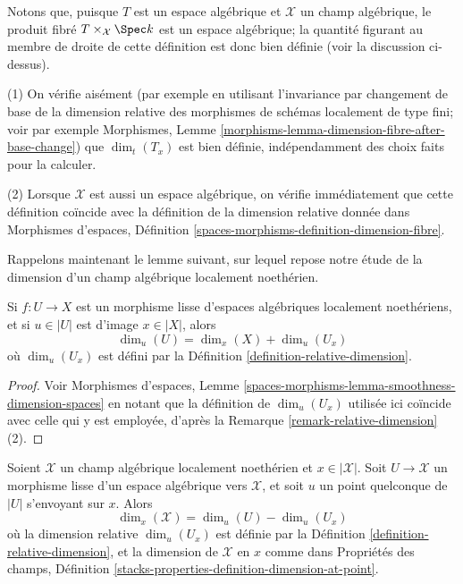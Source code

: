 \noindent
Notons que, puisque $T$ est un espace algébrique et $\mathcal{X}$ un
champ algébrique, le produit fibré $T \times_{\mathcal{X}} \Spec k$
est un espace algébrique; la quantité figurant au membre de droite de
cette définition est donc bien définie (voir la discussion ci-dessus).

\begin{remark}
\label{remark-relative-dimension}
(1)
On vérifie aisément (par exemple en utilisant l'invariance
par changement de base de la dimension relative des morphismes de schémas localement
de type fini; voir par exemple
Morphismes, Lemme \ref{morphisms-lemma-dimension-fibre-after-base-change})
que $\dim_t(T_x)$ est bien définie, indépendamment des choix
faits pour la calculer.

\medskip\noindent
(2)
Lorsque $\mathcal{X}$ est aussi un espace algébrique,
on vérifie immédiatement que cette définition coïncide avec
la définition de la dimension relative donnée dans
Morphismes d'espaces, Définition
\ref{spaces-morphisms-definition-dimension-fibre}.
\end{remark}

\noindent
Rappelons maintenant le lemme suivant, sur lequel repose notre étude de
la dimension d'un champ algébrique localement noethérien.

\begin{lemma}
\label{lemma-behaviour-of-dimensions-wrt-smooth-morphisms}
Si $f: U \to X$ est un morphisme lisse d'espaces algébriques localement
noethériens, et
si $u \in |U|$ est d'image $x \in |X|$, alors
$$
\dim_u (U) = \dim_x(X) + \dim_{u} (U_x)
$$
où $\dim_u (U_x)$ est défini par la
Définition \ref{definition-relative-dimension}.
\end{lemma}

\begin{proof}
Voir Morphismes d'espaces, Lemme
\ref{spaces-morphisms-lemma-smoothness-dimension-spaces}
en notant que la définition de $\dim_u (U_x)$ utilisée ici coïncide avec
celle qui y est employée, d'après la Remarque \ref{remark-relative-dimension} (2).
\end{proof}

\begin{lemma}
\label{lemma-dimension-for-stacks}
Soient $\mathcal{X}$ un champ algébrique localement noethérien et
$x \in |\mathcal{X}|$. Soit $U \to \mathcal{X}$ un morphisme lisse
d'un espace algébrique vers $\mathcal{X}$, et soit $u$ un point quelconque de $|U|$
s'envoyant sur $x$. Alors
$$
\dim_x(\mathcal{X}) =  \dim_u(U) - \dim_{u}(U_x)
$$
où la dimension relative $\dim_u(U_x)$ est définie
par la Définition \ref{definition-relative-dimension}, et la
dimension de $\mathcal{X}$ en $x$ comme dans
Propriétés des champs, Définition
\ref{stacks-properties-definition-dimension-at-point}.
\end{lemma}


